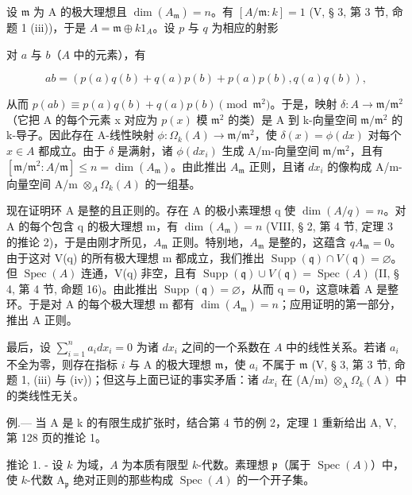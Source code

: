 设 \(\mathfrak{m}\) 为 A 的极大理想且 \(\dim(A_{\mathfrak{m}})=n\)。有 \([A/\mathfrak{m}:k]=1\) (V, § 3, 第 3 节, 命题 1 (iii))，于是 \(A=\mathfrak{m}\oplus k1_{A}\)。设 \(p\) 与 \(q\) 为相应的射影

对 \(a\) 与 \(b\)（\(A\) 中的元素），有

\[
a b = \left(p (a) q (b) + q (a) p (b) + p (a) p (b), q (a) q (b)\right),
\]

从而 \(p(ab) \equiv p(a)q(b) + q(a)p(b) \pmod{\mathfrak{m}^{2}}\)。于是，映射 \(\delta: A \to \mathfrak{m}/\mathfrak{m}^{2}\)（它把 A 的每个元素 x 对应为 \(p(x)\) 模 \(\mathfrak{m}^{2}\) 的类）是 A 到 k-向量空间 \(\mathfrak{m}/\mathfrak{m}^{2}\) 的 k-导子。因此存在 A-线性映射 \(\phi: \Omega_{k}(A) \to \mathfrak{m}/\mathfrak{m}^{2}\)，使 \(\delta(x) = \phi(dx)\) 对每个 \(x \in A\) 都成立。由于 \(\delta\) 是满射，诸 \(\phi(dx_{i})\) 生成 A/m-向量空间 \(\mathfrak{m}/\mathfrak{m}^{2}\)，且有 \([\mathfrak{m}/\mathfrak{m}^{2}: A/\mathfrak{m}] \leqslant n = \dim(A_{\mathfrak{m}})\)。由此推出 \(A_{\mathfrak{m}}\) 正则，且诸 \(dx_{i}\) 的像构成 A/m-向量空间 A/m \(\otimes_{A} \Omega_{k}(A)\) 的一组基。

现在证明环 A 是整的且正则的。存在 A 的极小素理想 q 使 \(\dim(A/q) = n\)。对 A 的每个包含 q 的极大理想 m，有 \(\dim(A_{\mathfrak{m}}) = n\) (VIII, § 2, 第 4 节, 定理 3 的推论 2)，于是由刚才所见，\(A_{\mathfrak{m}}\) 正则。特别地，\(A_{\mathfrak{m}}\) 是整的，这蕴含 \(qA_{\mathfrak{m}} = 0\)。由于这对 V(q) 的所有极大理想 m 都成立，我们推出 \(\operatorname{Supp}(\mathfrak{q}) \cap V(\mathfrak{q}) = \varnothing\)。但 \(\operatorname{Spec}(A)\) 连通，V(q) 非空，且有 \(\operatorname{Supp}(\mathfrak{q}) \cup V(\mathfrak{q}) = \operatorname{Spec}(A)\) (II, § 4, 第 4 节, 命题 16)。由此推出 \(\operatorname{Supp}(\mathfrak{q}) = \varnothing\)，从而 q = 0，这意味着 A 是整环。于是对 A 的每个极大理想 m 都有 \(\dim(A_{\mathfrak{m}}) = n\)；应用证明的第一部分，推出 A 正则。

最后，设 \(\sum_{i=1}^{n} a_i dx_i = 0\) 为诸 \(dx_i\) 之间的一个系数在 \(A\) 中的线性关系。若诸 \(a_i\) 不全为零，则存在指标 \(i\) 与 A 的极大理想 \(\mathfrak{m}\)，使 \(a_i\) 不属于 \(\mathfrak{m}\) (V, § 3, 第 3 节, 命题 1, (iii) 与 (iv))；但这与上面已证的事实矛盾：诸 \(dx_i\) 在 (A/m) \(\otimes_{\mathrm{A}} \Omega_k(\mathrm{A})\) 中的类线性无关。

例.--- 当 A 是 k 的有限生成扩张时，结合第 4 节的例 2，定理 1 重新给出 A, V, 第 128 页的推论 1。

推论 1. - 设 \(k\) 为域，\(A\) 为本质有限型 \(k\)-代数。素理想 \(\mathfrak{p}\)（属于 \(\operatorname{Spec}(A)\)）中，使 \(k\)-代数 \(\mathrm{A}_{\mathfrak{p}}\) 绝对正则的那些构成 \(\operatorname{Spec}(A)\) 的一个开子集。

